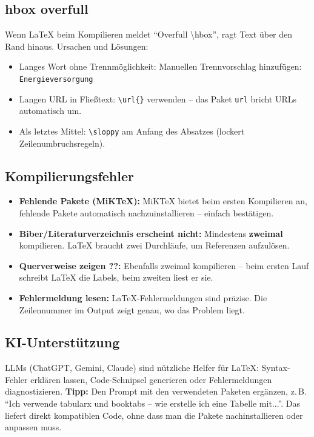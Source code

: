 \subsection{hbox overfull}
Wenn LaTeX beim Kompilieren meldet \enquote{Overfull \textbackslash hbox}, ragt Text über den Rand hinaus.
Ursachen und Lösungen:
\begin{itemize}
    \item Langes Wort ohne Trennmöglichkeit: Manuellen Trennvorschlag hinzufügen: \texttt{Ener\-gie\-ver\-sor\-gung}
    \item Langen URL in Fließtext: \texttt{\textbackslash url\{\}} verwenden – das Paket \texttt{url} bricht URLs automatisch um.
    \item Als letztes Mittel: \texttt{\textbackslash sloppy} am Anfang des Absatzes (lockert Zeilenumbruchsregeln).
\end{itemize}

\subsection{Kompilierungsfehler}
\begin{itemize}
    \item \textbf{Fehlende Pakete (MiKTeX):} MiKTeX bietet beim ersten Kompilieren an, fehlende Pakete automatisch nachzuinstallieren – einfach bestätigen.
    \item \textbf{Biber/Literaturverzeichnis erscheint nicht:} Mindestens \textbf{zweimal} kompilieren. LaTeX braucht zwei Durchläufe, um Referenzen aufzulösen.
    \item \textbf{Querverweise zeigen ??:} Ebenfalls zweimal kompilieren – beim ersten Lauf schreibt LaTeX die Labels, beim zweiten liest er sie.
    \item \textbf{Fehlermeldung lesen:} LaTeX-Fehlermeldungen sind präzise. Die Zeilennummer im Output zeigt genau, wo das Problem liegt.
\end{itemize}

\subsection{KI-Unterstützung}
LLMs (ChatGPT, Gemini, Claude) sind nützliche Helfer für LaTeX: Syntax-Fehler erklären lassen, Code-Schnipsel generieren oder Fehlermeldungen diagnostizieren.
\textbf{Tipp:} Den Prompt mit den verwendeten Paketen ergänzen, z.\,B. \enquote{Ich verwende tabularx und booktabs – wie erstelle ich eine Tabelle mit...}.
Das liefert direkt kompatiblen Code, ohne dass man die Pakete nachinstallieren oder anpassen muss.

